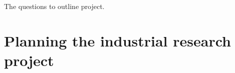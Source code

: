 \documentclass[12pt]{article}
\date{}
\begin{document}
\maketitle

The questions to outline project.


\section{Planning the industrial research project}
\end{document}
